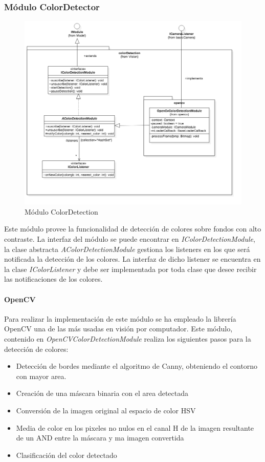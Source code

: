 \subsubsection{Módulo ColorDetector}
\begin{figure}
	\centering
	\includegraphics[width=1\linewidth]{imagenes/diagramas/ColorDetectionModule.png}
	\caption{Módulo ColorDetection}
	\label{fig:color-detection-module}
\end{figure}
Este módulo provee la funcionalidad de detección de colores sobre fondos con alto contraste. La interfaz del módulo se puede encontrar en \textit{IColorDetectionModule}, la clase abstracta \textit{AColorDetectionModule} gestiona los listeners en los que será notificada la detección de los colores. La interfaz de dicho listener se encuentra en la clase \textit{IColorListener} y debe ser implementada por toda clase que desee recibir las notificaciones de los colores.

\paragraph{OpenCV}

Para realizar la implementación de este módulo se ha empleado la librería OpenCV\cite{opencv} una de las más usadas en visión por computador. Este módulo, contenido en \textit{OpenCVColorDetectionModule} realiza los siguientes pasos para la detección de colores:
\begin{itemize}
	\item Detección de bordes mediante el algoritmo de Canny, obteniendo el contorno con mayor area.
	\item Creación de una máscara binaria con el area detectada
	\item Conversión de la imagen original al espacio de color HSV
	\item Media de color en los pixeles no nulos en el canal H de la imagen resultante de un AND entre la máscara y ma imagen convertida
	\item Clasificación del color detectado
\end{itemize}

